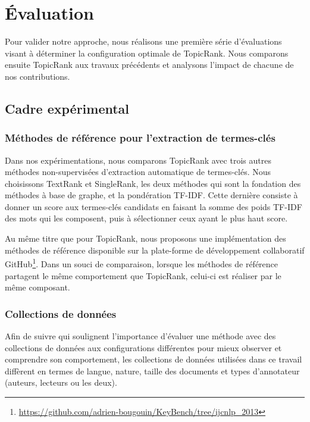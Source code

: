 \section{Évaluation}
\label{sec:evaluation}
  Pour valider notre approche, nous réalisons une première série d'évaluations
  visant à déterminer la configuration optimale de TopicRank. Nous comparons 
  ensuite TopicRank aux travaux précédents et analysons l'impact de chacune de
  nos contributions.

  \subsection{Cadre expérimental}
  \label{subsec:cadre_experimental}
    \subsubsection{Méthodes de référence pour l'extraction de termes-clés}
    \label{subsubsec:systemes_de_reference_pour_l_extraction_de_termes_cles}
      Dans nos expérimentations, nous comparons TopicRank avec trois autres
      méthodes non-supervisées d'extraction automatique de termes-clés. Nous
      choisissons TextRank et SingleRank, les deux méthodes qui sont la
      fondation des méthodes à base de graphe, et la pondération TF-IDF. Cette
      dernière consiste à donner un score aux termes-clés candidats en faisant
      la somme des poids TF-IDF des mots qui les composent, puis à sélectionner
      ceux ayant le plus haut score.

      Au même titre que pour TopicRank, nous proposons une implémentation des
      méthodes de référence disponible sur la plate-forme de développement
      collaboratif
      GitHub\footnote{\url{https://github.com/adrien-bougouin/KeyBench/tree/ijcnlp_2013}}.
      Dans un souci de comparaison, lorsque les méthodes de référence partagent
      le même comportement que TopicRank, celui-ci est réaliser par le même
      composant.

    \subsubsection{Collections de données}
    \label{subsubsec:donnees_de_test}
      Afin de suivre  qui soulignent l'importance
      d'évaluer une méthode avec des collections de données aux configurations
      différentes pour mieux observer et comprendre son comportement, les
      collections de données utilisées dans ce travail diffèrent en termes de
      langue, nature, taille des documents et types d'annotateur (auteurs,
      lecteurs ou les deux).


